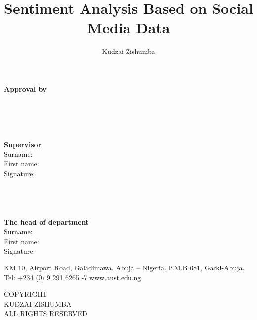 \documentclass[final,a4paper]{aust_thesis}
\title{%
Sentiment Analysis Based on Social Media Data
}
\author{%
Kudzai Zishumba
}
\begin{document}
\begin{figure}[h]
  \centering
\end{figure}



\begin{center}
\large\textbf{Approval by}
\end{center}
\leavevmode\\
\leavevmode\\
\leavevmode\\
\leavevmode\\
\noindent
\textbf{Supervisor}\\
Surname:\\
First name:\\
Signature:\\
\\
\\
\\
\\
\noindent
\textbf{The head of department}\\
Surname:\\
First name:\\
Signature:\\


\vspace*{\fill}
\begingroup
\begin{center}
\tiny KM 10, Airport Road, Galadimawa. Abuja – Nigeria. P.M.B 681, Garki-Abuja. Tel: +234 (0) 9 291 6265 -7
www.aust.edu.ng
\end{center}
\endgroup




\pagebreak
\vspace*{\fill}
\begingroup
\centering

COPYRIGHT \\
KUDZAI ZISHUMBA\\
ALL RIGHTS RESERVED\\
 
\endgroup
\end{document}
